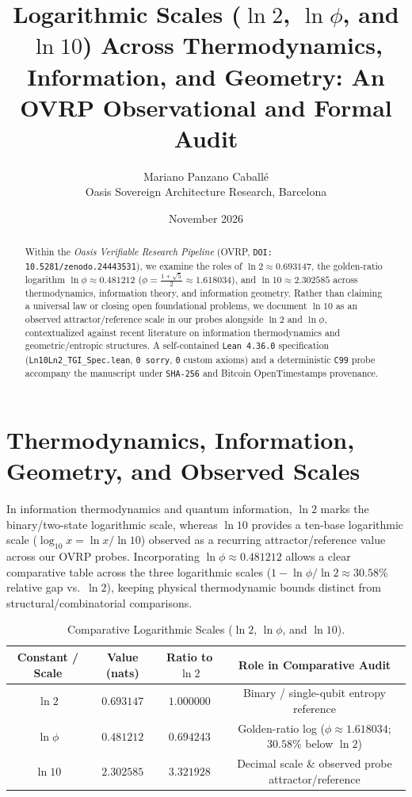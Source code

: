 \documentclass[11pt,a4paper]{article}
\title{Logarithmic Scales ($\ln 2$, $\ln \phi$, and $\ln 10$) Across Thermodynamics, Information, and Geometry: An OVRP Observational and Formal Audit}
\author{Mariano Panzano Caball\'e \\ \small Oasis Sovereign Architecture Research, Barcelona}
\date{November 2026}
\begin{document}
\maketitle

\begin{abstract}
Within the \emph{Oasis Verifiable Research Pipeline} (OVRP, \texttt{DOI: 10.5281/zenodo.24443531}), we examine the roles of $\ln 2 \approx 0.693147$, the golden-ratio logarithm $\ln \phi \approx 0.481212$ ($\phi = \frac{1+\sqrt{5}}{2} \approx 1.618034$), and $\ln 10 \approx 2.302585$ across thermodynamics, information theory, and information geometry. Rather than claiming a universal law or closing open foundational problems, we document $\ln 10$ as an observed attractor/reference scale in our probes alongside $\ln 2$ and $\ln \phi$, contextualized against recent literature on information thermodynamics and geometric/entropic structures. A self-contained \texttt{Lean~4.36.0} specification (\texttt{Ln10Ln2\_TGI\_Spec.lean}, \texttt{0 sorry}, \texttt{0} custom axioms) and a deterministic \texttt{C99} probe accompany the manuscript under \texttt{SHA-256} and Bitcoin OpenTimestamps provenance.
\end{abstract}

\section{Thermodynamics, Information, Geometry, and Observed Scales}
In information thermodynamics and quantum information, $\ln 2$ marks the binary/two-state logarithmic scale, whereas $\ln 10$ provides a ten-base logarithmic scale ($\log_{10} x = \ln x / \ln 10$) observed as a recurring attractor/reference value across our OVRP probes. Incorporating $\ln \phi \approx 0.481212$ allows a clear comparative table across the three logarithmic scales ($1 - \ln \phi / \ln 2 \approx 30.58\%$ relative gap vs.\ $\ln 2$), keeping physical thermodynamic bounds distinct from structural/combinatorial comparisons.

\begin{table}[h!]
\centering
\caption{Comparative Logarithmic Scales ($\ln 2$, $\ln \phi$, and $\ln 10$).}
\begin{tabular}{cccc}
\hline
Constant / Scale & Value (nats) & Ratio to $\ln 2$ & Role in Comparative Audit \\
\hline
$\ln 2$ & $0.693147$ & $1.000000$ & Binary / single-qubit entropy reference \\
$\ln \phi$ & $0.481212$ & $0.694243$ & Golden-ratio log ($\phi \approx 1.618034$; $30.58\%$ below $\ln 2$) \\
$\ln 10$ & $2.302585$ & $3.321928$ & Decimal scale \& observed probe attractor/reference \\
\hline
\end{tabular}
\end{table}
\end{document}
